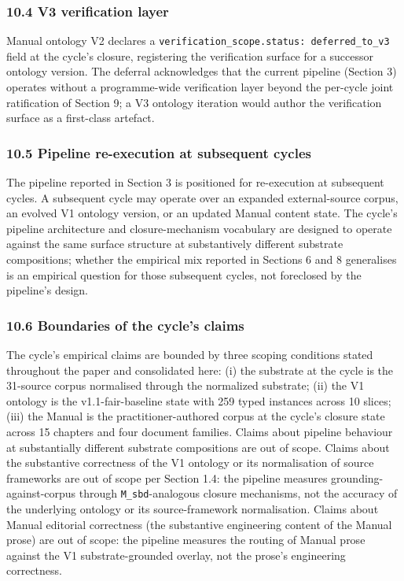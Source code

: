 \documentclass[
]{article}
\begin{document}
\subsubsection{10.4 V3 verification layer}\label{v3-verification-layer}

Manual ontology V2 declares a
\texttt{verification\_scope.status:\ deferred\_to\_v3} field at the
cycle's closure, registering the verification surface for a successor
ontology version. The deferral acknowledges that the current pipeline
(Section 3) operates without a programme-wide verification layer beyond
the per-cycle joint ratification of Section 9; a V3 ontology iteration
would author the verification surface as a first-class artefact.

\subsubsection{10.5 Pipeline re-execution at subsequent
cycles}\label{pipeline-re-execution-at-subsequent-cycles}

The pipeline reported in Section 3 is positioned for re-execution at
subsequent cycles. A subsequent cycle may operate over an expanded
external-source corpus, an evolved V1 ontology version, or an updated
Manual content state. The cycle's pipeline architecture and
closure-mechanism vocabulary are designed to operate against the same
surface structure at substantively different substrate compositions;
whether the empirical mix reported in Sections 6 and 8 generalises is an
empirical question for those subsequent cycles, not foreclosed by the
pipeline's design.

\subsubsection{10.6 Boundaries of the cycle's
claims}\label{boundaries-of-the-cycles-claims}

The cycle's empirical claims are bounded by three scoping conditions
stated throughout the paper and consolidated here: (i) the substrate at
the cycle is the 31-source corpus normalised through the normalized
substrate; (ii) the V1 ontology is the v1.1-fair-baseline state with 259
typed instances across 10 slices; (iii) the Manual is the
practitioner-authored corpus at the cycle's closure state across 15
chapters and four document families. Claims about pipeline behaviour at
substantially different substrate compositions are out of scope. Claims
about the substantive correctness of the V1 ontology or its
normalisation of source frameworks are out of scope per Section 1.4: the
pipeline measures grounding-against-corpus through
\texttt{M\_sbd}-analogous closure mechanisms, not the accuracy of the
underlying ontology or its source-framework normalisation. Claims about
Manual editorial correctness (the substantive engineering content of the
Manual prose) are out of scope: the pipeline measures the routing of
Manual prose against the V1 substrate-grounded overlay, not the prose's
engineering correctness.
\end{document}
